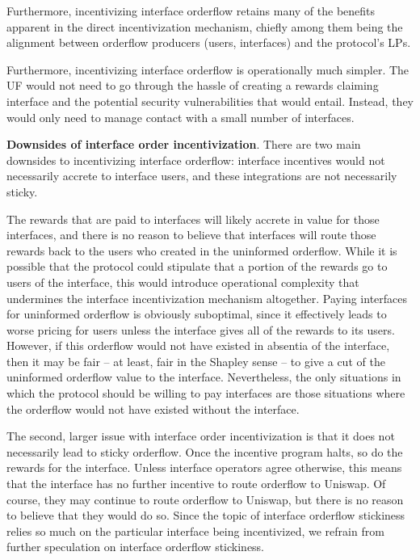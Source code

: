         Furthermore, incentivizing interface orderflow retains many of the benefits apparent in the direct incentivization mechanism, chiefly among them being the alignment between orderflow producers (users, interfaces) and the protocol's LPs.

        Furthermore, incentivizing interface orderflow is operationally much simpler. The UF would not need to go through the hassle of creating a rewards claiming interface and the potential security vulnerabilities that would entail. Instead, they would only need to manage contact with a small number of interfaces.


        \textbf{Downsides of interface order incentivization}.
        There are two main downsides to incentivizing interface orderflow: interface incentives would not necessarily accrete to interface users, and these integrations are not necessarily sticky.

        The rewards that are paid to interfaces will likely accrete in value for those interfaces, and there is no reason to believe that interfaces will route those rewards back to the users who created in the uninformed orderflow. While it is possible that the protocol could stipulate that a portion of the rewards go to users of the interface, this would introduce operational complexity that undermines the interface incentivization mechanism altogether. Paying interfaces for uninformed orderflow is obviously suboptimal, since it effectively leads to worse pricing for users unless the interface gives all of the rewards to its users. However, if this orderflow would not have existed in absentia of the interface, then it may be fair -- at least, fair in the Shapley sense \cite{shapley1997value} -- to give a cut of the uninformed orderflow value to the interface. Nevertheless, the only situations in which the protocol should be willing to pay interfaces are those situations where the orderflow would not have existed without the interface.

        The second, larger issue with interface order incentivization is that it does not necessarily lead to sticky orderflow. Once the incentive program halts, so do the rewards for the interface. Unless interface operators agree otherwise, this means that the interface has no further incentive to route orderflow to Uniswap. Of course, they may continue to route orderflow to Uniswap, but there is no reason to believe that they would do so. Since the topic of interface orderflow stickiness relies so much on the particular interface being incentivized, we refrain from further speculation on interface orderflow stickiness.


